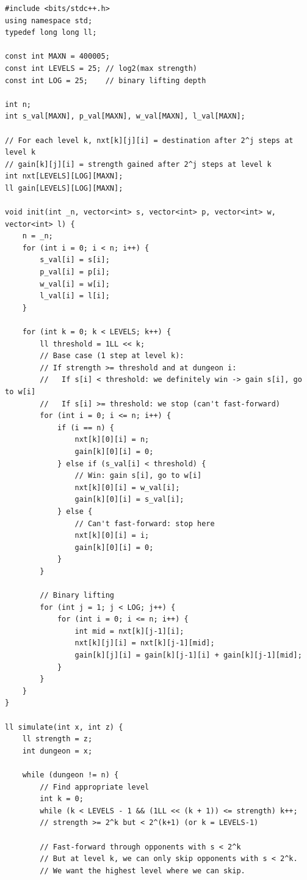 \documentclass[11pt,a4paper]{article}
\begin{document}
\begin{lstlisting}
#include <bits/stdc++.h>
using namespace std;
typedef long long ll;

const int MAXN = 400005;
const int LEVELS = 25; // log2(max strength)
const int LOG = 25;    // binary lifting depth

int n;
int s_val[MAXN], p_val[MAXN], w_val[MAXN], l_val[MAXN];

// For each level k, nxt[k][j][i] = destination after 2^j steps at level k
// gain[k][j][i] = strength gained after 2^j steps at level k
int nxt[LEVELS][LOG][MAXN];
ll gain[LEVELS][LOG][MAXN];

void init(int _n, vector<int> s, vector<int> p, vector<int> w, vector<int> l) {
    n = _n;
    for (int i = 0; i < n; i++) {
        s_val[i] = s[i];
        p_val[i] = p[i];
        w_val[i] = w[i];
        l_val[i] = l[i];
    }

    for (int k = 0; k < LEVELS; k++) {
        ll threshold = 1LL << k;
        // Base case (1 step at level k):
        // If strength >= threshold and at dungeon i:
        //   If s[i] < threshold: we definitely win -> gain s[i], go to w[i]
        //   If s[i] >= threshold: we stop (can't fast-forward)
        for (int i = 0; i <= n; i++) {
            if (i == n) {
                nxt[k][0][i] = n;
                gain[k][0][i] = 0;
            } else if (s_val[i] < threshold) {
                // Win: gain s[i], go to w[i]
                nxt[k][0][i] = w_val[i];
                gain[k][0][i] = s_val[i];
            } else {
                // Can't fast-forward: stop here
                nxt[k][0][i] = i;
                gain[k][0][i] = 0;
            }
        }

        // Binary lifting
        for (int j = 1; j < LOG; j++) {
            for (int i = 0; i <= n; i++) {
                int mid = nxt[k][j-1][i];
                nxt[k][j][i] = nxt[k][j-1][mid];
                gain[k][j][i] = gain[k][j-1][i] + gain[k][j-1][mid];
            }
        }
    }
}

ll simulate(int x, int z) {
    ll strength = z;
    int dungeon = x;

    while (dungeon != n) {
        // Find appropriate level
        int k = 0;
        while (k < LEVELS - 1 && (1LL << (k + 1)) <= strength) k++;
        // strength >= 2^k but < 2^(k+1) (or k = LEVELS-1)

        // Fast-forward through opponents with s < 2^k
        // But at level k, we can only skip opponents with s < 2^k.
        // We want the highest level where we can skip.


\end{lstlisting}
\end{document}
